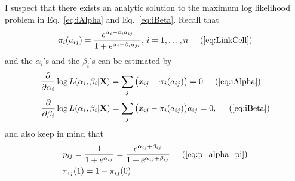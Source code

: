 \documentclass[12pt]{article}
\begin{document}
I suspect that there exists an analytic solution to the maximum log likelihood problem in Eq.~\ref{eq:iAlpha} and  Eq.~\ref{eq:iBeta}.
Recall that
\begin{align*}
  \pi_i(a_{ij}) = \frac{e^{\alpha_{i} + \beta_{i} a_{ij}}}{1 + e^{\alpha_{i} + \beta_{i} a_{ji}}}, \, i = 1, \ldots, n  \hspace{5mm}  (\ref{eq:LinkCell})
\end{align*}
and the $\alpha_{i}$'s and the $\beta_{i}$'s can be estimated by
\begin{align*}
  \frac{\partial}{\partial \alpha_i} \log L(\alpha_i, \beta_i|\mathbf{X}) &= \sum_{j} \big (x_{ij} -\pi_i(a_{ij}) \big ) = 0   \hspace{5mm}  (\ref{eq:iAlpha}) \\
  \frac{\partial}{\partial \beta_i} \log L(\alpha_i, \beta_i|\mathbf{X}) &= \sum_{j}\big  (x_{ij} - \pi_i(a_{ij}) \big )a_{ij} = 0, \hspace{5mm}  (\ref{eq:iBeta})
\end{align*}
and also keep in mind that
\begin{align*}
  & p_{ij} =  \frac{1}{1 + e^{\alpha_{ij}}} =  \frac{e^{\alpha_{ij} + \beta_{ij}}}{1 + e^{\alpha_{ij} + \beta_{ij}}} \hspace{5mm}  (\ref{eq:p_alpha_pi}) \\
  & \pi_{ij}(1)  = 1 - \pi_{ij}(0) \nonumber
\end{align*}
\end{document}
